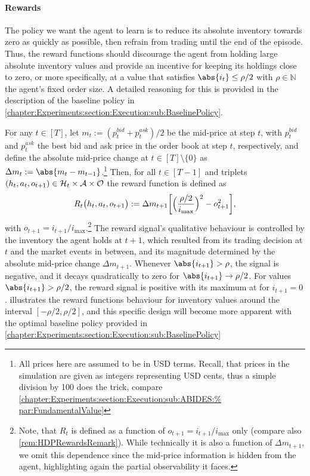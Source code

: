 \documentclass[
    a4paper,
    11pt,
    bibliography=totoc,
    listof=totoc,      
    headinclude=true,
    cleardoublepage=empty,
]{scrbook}
\theoremstyle{plain}
\theoremstyle{definition}
\theoremstyle{remark}
\newcommand{\SetN}{\mathbb N}
\newcommand{\SpaceA}{{\cal A}}
\newcommand{\SpaceO}{{\cal O}}
\newcommand{\SpaceH}{{\cal H}}
\begin{document}
\paragraph{Rewards}
\label{chapter:Experiments:section:Execution:sub:Environment:par:Rewards}

The policy we want the agent to learn is to reduce its absolute inventory
towards zero as quickly as possible, then refrain from trading until the end 
of the episode. Thus, the reward functions should discourage the agent from 
holding large absolute inventory values and provide an incentive for keeping 
its holdings close to zero, or more specifically, at a value that satisfies 
$\abs{i_t}\leq \rho/2$ with $\rho\in\SetN$ the agent's fixed order size. A 
detailed reasoning for this is provided in the description of the baseline 
policy in \cref{chapter:Experiments:section:Execution:sub:BaselinePolicy}.

For any $t\in[T]$, let $m_t:=(p_t^{bid}+p_t^{ask})/2$ be the mid-price at step 
$t$, with $p_t^{bid}$ and $p_t^{ask}$ the best bid and ask price in the order 
book at step $t$, respectively, and define the absolute mid-price change at $t\in[T]\setminus\{0\}$ as $\Delta m_t := \abs{m_{t} - m_{t-1}}$.\footnote{
    All prices here are assumed to be in USD terms. Recall, that prices in the 
    simulation are given as integers representing USD cents, thus a simple 
    division by 100 does the trick, compare 
    \cref{chapter:Experiments:section:Execution:sub:ABIDES:%
    par:FundamentalValue}
}
Then, for all $t\in[T-1]$ and triplets $(h_t,a_t,o_{t+1}) \in \SpaceH_t \times 
\SpaceA \times \SpaceO$ the reward function is defined as 
\begin{equation}
    \label{eq:RewardExecution}
    R_t\bigl(h_t, a_t, o_{t+1}\bigr)
    := \Delta m_{t+1} \biggl[
            \Bigl(\frac{\rho/2}{i_{\max}}\Bigr)^2
            - o_{t+1}^2
        \biggr],
\end{equation}
with $o_{t+1} = i_{t+1}/i_{\max}$.\footnote{
    Note, that $R_t$ is defined as a function of $o_{t+1} = i_{t+1}/i_{\max}$ 
    only (compare also \cref{rem:HDPRewardsRemark}). While technically it is 
    also a function of $\Delta m_{t+1}$, we omit this dependence since the 
    mid-price information is hidden from the agent, highlighting again the partial observability it faces.
}
The reward signal's qualitative behaviour is controlled by the inventory the 
agent holds at $t+1$, which resulted from its trading decision at $t$ and the 
market events in between, and its magnitude determined by the absolute 
mid-price change $\Delta m_{t+1}$. Whenever $\abs{i_{t+1}}>\rho$, the signal 
is negative, and it decays quadratically to zero for $\abs{i_{t+1}} \to 
\rho/2$. For values $\abs{i_{t+1}} > \rho/2$, the reward signal is positive 
with its maximum at for $i_{t+1}=0$.  
illustrates the reward functions behaviour for inventory values around the 
interval $[-\rho/2, \rho/2]$, and this specific design will become more 
apparent with the optimal baseline policy provided in 
\cref{chapter:Experiments:section:Execution:sub:BaselinePolicy}
\end{document}
